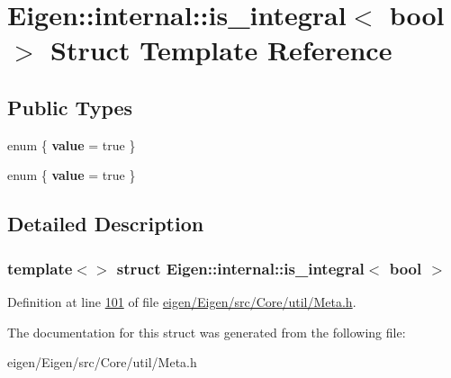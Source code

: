\hypertarget{struct_eigen_1_1internal_1_1is__integral_3_01bool_01_4}{}\section{Eigen\+:\+:internal\+:\+:is\+\_\+integral$<$ bool $>$ Struct Template Reference}
\label{struct_eigen_1_1internal_1_1is__integral_3_01bool_01_4}
\subsection*{Public Types}
\begin{DoxyCompactItemize}
\item 
\mbox{\label{struct_eigen_1_1internal_1_1is__integral_3_01bool_01_4_af7c87dd49a101d4affdea8f841f288c5}} 
enum \{ {\bfseries value} = true
 \}
\item 
\mbox{\label{struct_eigen_1_1internal_1_1is__integral_3_01bool_01_4_ae7bd8705cd50d0bd365665c7fcaee34e}} 
enum \{ {\bfseries value} = true
 \}
\end{DoxyCompactItemize}


\subsection{Detailed Description}
\subsubsection*{template$<$$>$\newline
struct Eigen\+::internal\+::is\+\_\+integral$<$ bool $>$}



Definition at line \hyperlink{eigen_2_eigen_2src_2_core_2util_2_meta_8h_source_l00101}{101} of file \hyperlink{eigen_2_eigen_2src_2_core_2util_2_meta_8h_source}{eigen/\+Eigen/src/\+Core/util/\+Meta.\+h}.



The documentation for this struct was generated from the following file\+:\begin{DoxyCompactItemize}
\item 
eigen/\+Eigen/src/\+Core/util/\+Meta.\+h\end{DoxyCompactItemize}
